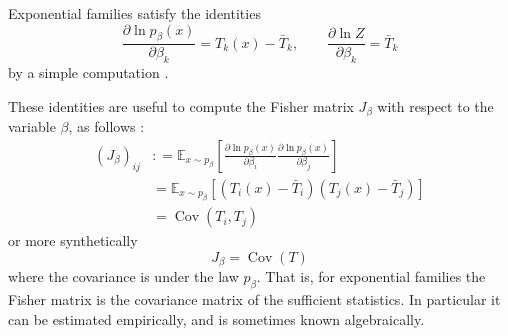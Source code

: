 \documentclass[11pt,a4paper]{article}
\newcommand{\deq}{\mathrel{\mathop{:}}=}
\DeclareMathOperator{\Cov}{Cov}
\newcommand{\E}{\mathbb{E}}
\newcommand{\1}{\mathbbm{1}}
\theoremstyle{yannthm}
\theoremstyle{yannthm2}
\numberwithin{equation}{section}
\begin{document}
{Exponential families satisfy the identities
\begin{equation}
\label{eq:expder}
\frac{\partial \ln p_\beta(x)}{\partial \beta_k}=T_k(x)-\bar T_k,\qquad
\frac{\partial \ln Z}{\partial \beta_k}=\bar T_k
\end{equation}
by a simple computation \cite[(2.33)]{Amari2000book}.

These identities are useful to compute the Fisher matrix $J_\beta$ with
respect to the variable $\beta$, as follows \cite[(3.59)]{Amari2000book}:
\begin{align}
(J_\beta)_{ij} &\deq \E_{x\sim p_\beta} \left[
\frac{\partial \ln p_\beta(x)}{\partial \beta_i}
\frac{\partial \ln p_\beta(x)}{\partial \beta_j}
\right]
\\&= \E_{x\sim p_\beta} \left[ (T_i(x)-\bar T_i)(T_j(x)-\bar T_j)\right]
\\&= \Cov (T_i,T_j)
\label{eq:J=cov_comp}
\end{align}
or more synthetically
\begin{equation}
J_\beta=\Cov(T)
\end{equation}
where the covariance is under the law $p_\beta$. That is, for exponential
families the Fisher matrix
is the covariance matrix of the sufficient statistics. In particular it
can be estimated empirically, and is sometimes known algebraically.

}
\end{document}

